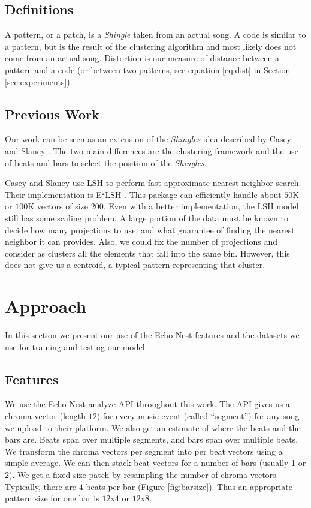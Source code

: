 \documentclass{article}
\begin{document}
\subsection{Definitions}
A pattern, or a patch, is a \textit{Shingle} taken from an actual song.
A code is similar to a pattern, but is the result of the clustering
algorithm and most likely does not come from an actual song.
Distortion is our measure of distance between a pattern and a code
(or between two patterns, see equation \ref{eq:dist} in Section 
\ref{sec:experiments}).


\subsection{Previous Work}\label{sec:prevwork}
Our work can be seen as an extension of the \textit{Shingles} idea
described by Casey and Slaney \cite{Casey2006,Casey2007,Casey2008}.
The two main differences are the clustering framework and the use of
beats and bars to select the position of the \textit{Shingles}.

Casey and Slaney \cite{Casey2006} use LSH \cite{Datar2004} to perform
fast approximate nearest neighbor search. Their implementation is E$^2$LSH
\cite{E2LSH}. This package can efficiently handle about $50$K or $100$K
vectors of size $200$. Even with a better implementation, the LSH
model still has some scaling problem. A large portion of the data
must be known to decide how many projections to use, and what guarantee
of finding the nearest neighbor it can provides. Also, we could fix the
number of projections and consider as clusters all the elements that
fall into the same bin. However, this does not give us a centroid, a
typical pattern representing that cluster.


\section{Approach}\label{sec:approach}
In this section we present our use of the Echo Nest features and the
datasets we use for training and testing our model.

\subsection{Features}
We use the Echo Nest analyze API \cite{EchoNest} throughout this work.
The API gives us a chroma vector (length $12$) for every music event (called 
``segment'') for any song we upload to their platform. 
We also get an estimate of where the beats and the bars are. Beats span over
multiple segments, and bars span over multiple beats. 
We transform the chroma vectors per segment into per beat vectors using a 
simple average. We can then stack beat vectors for a number of bars 
(usually 1 or 2). 
We get a fixed-size patch by resampling the number of chroma vectors. Typically,
there are $4$ beats per bar (Figure \ref{fig:barsize}). 
Thus an appropriate pattern size for one bar
is $12$x$4$ or $12$x$8$.
\end{document}
